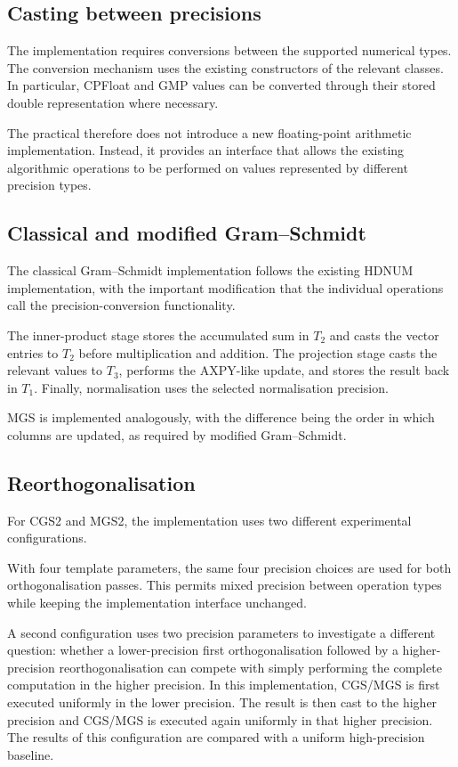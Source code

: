 \documentclass[a4paper,11pt]{article}
\begin{document}
\subsection{Casting between precisions}

The implementation requires conversions between the supported numerical types.
The conversion mechanism uses the existing constructors of the relevant
classes. In particular, CPFloat and GMP values can be converted through their
stored double representation where necessary.

The practical therefore does not introduce a new floating-point arithmetic
implementation. Instead, it provides an interface that allows the existing
algorithmic operations to be performed on values represented by different
precision types.

\subsection{Classical and modified Gram--Schmidt}

The classical Gram--Schmidt implementation follows the existing HDNUM
implementation, with the important modification that the individual
operations call the precision-conversion functionality.

The inner-product stage stores the accumulated sum in $T_2$ and casts the
vector entries to $T_2$ before multiplication and addition. The projection
stage casts the relevant values to $T_3$, performs the AXPY-like update, and
stores the result back in $T_1$. Finally, normalisation uses the selected
normalisation precision.

MGS is implemented analogously, with the difference being the order in which
columns are updated, as required by modified Gram--Schmidt.

\subsection{Reorthogonalisation}

For CGS2 and MGS2, the implementation uses two different experimental
configurations.

With four template parameters, the same four precision choices are used for
both orthogonalisation passes. This permits mixed precision between operation
types while keeping the implementation interface unchanged.

A second configuration uses two precision parameters to investigate a
different question: whether a lower-precision first orthogonalisation followed
by a higher-precision reorthogonalisation can compete with simply performing
the complete computation in the higher precision. In this implementation,
CGS/MGS is first executed uniformly in the lower precision. The result is
then cast to the higher precision and CGS/MGS is executed again uniformly in
that higher precision.
The results of this configuration are compared with a uniform high-precision
baseline.
\end{document}
